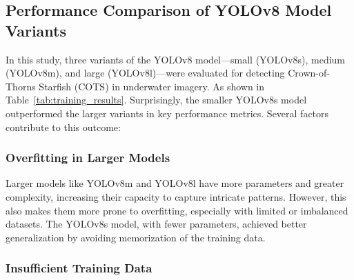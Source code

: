 \documentclass[conference]{IEEEtran}
\begin{document}
\begin{table}[t] %
    \centering
    \caption{Summary of YOLOv8 Model Training Results for COTS Detection}
    \label{tab:training_results}
\end{table}


\subsection{Performance Comparison of YOLOv8 Model Variants}

In this study, three variants of the YOLOv8 model—small (YOLOv8s), medium (YOLOv8m), and large (YOLOv8l)—were evaluated for detecting Crown-of-Thorns Starfish (COTS) in underwater imagery. As shown in Table~\ref{tab:training_results}. Surprisingly, the smaller YOLOv8s model outperformed the larger variants in key performance metrics. Several factors contribute to this outcome:

\subsubsection{Overfitting in Larger Models}

Larger models like YOLOv8m and YOLOv8l have more parameters and greater complexity, increasing their capacity to capture intricate patterns. However, this also makes them more prone to overfitting, especially with limited or imbalanced datasets. The YOLOv8s model, with fewer parameters, achieved better generalization by avoiding memorization of the training data.

\subsubsection{Insufficient Training Data}
\end{document}
